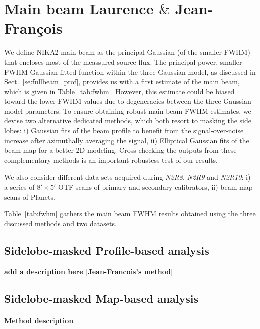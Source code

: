 \section{Main beam {\color{blue} Laurence $\&$ Jean-Fran\c cois}}
\label{se:MB}


We define NIKA2 main beam as the principal Gaussian (of the smaller FWHM)
that encloses most of the meassured source flux. The principal-power,
smaller-FWHM Gaussian fitted function within the three-Gaussian model,
as discussed in Sect.~\ref{se:fullbeam_prof}, provides us with a first
estimate of the main beam, which is given in Table~\ref{tab:fwhm}. However,
this estimate could be biased toward the lower-FWHM values due to
degeneracies between the three-Gaussian model parameters. To ensure
obtaining robust main beam FWHM estimates, we devise two alternative dedicated
methods, which both resort to masking the side lobes: i) Gaussian
fits of the beam profile to benefit from the signal-over-noise
increase after azimuthally averaging the signal, ii) Elliptical
Gaussian fits of the beam map for a better 2D modeling. Cross-checking
the outputs from these complementary methods is an important robustess
test of our results.

We also consider different data sets acquired during \emph{N2R8}, \emph{N2R9}
and \emph{N2R10}: i) a series of $8' \times 5'$ OTF
scans of primary and secondary calibrators, ii) beam-map scans of
Planets.

Table~\ref{tab:fwhm} gathers the main beam FWHM results obtained using the three
discussed methods and two datasets.  


\subsection{Sidelobe-masked Profile-based analysis}

{\bf add a description here [Jean-Francois's method]}

\subsection{Sidelobe-masked Map-based analysis}

\paragraph{Method description}

